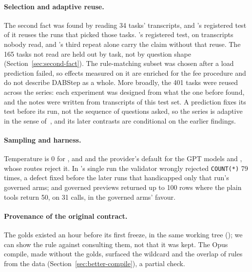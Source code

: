 \paragraph{Selection and adaptive reuse.} The second fact was found by
reading 34 tasks' transcripts, and \mLuna{}'s registered test of it reuses
the runs that picked those tasks. \mQwen{}'s registered test, on
transcripts nobody read, and \mLuna{}'s third repeat alone carry the claim
without that reuse. The 165 tasks not read are held out by task, not by
question shape (Section~\ref{sec:second-fact}). The rule-matching subset was chosen after a
load prediction failed, so effects measured on it are enriched for the fee
procedure and do not describe DABStep as a whole. More broadly, the 401
tasks were reused across the series: each experiment was designed from
what the one before found, and the notes were written from transcripts of
this test set. A prediction fixes its test before its run, not the
sequence of questions asked, so the series is adaptive in the sense
of~\cite{ladder}, and its later contrasts are conditional on the earlier
findings.

\paragraph{Sampling and harness.} Temperature is 0 for \mGLM{}, \mDS{}
and \mQwen{} and the provider's default for the GPT models and \mSON{},
whose routes reject it. In \mGLM{}'s
single run the validator wrongly rejected \texttt{COUNT(*)} 79 times, a
defect fixed before the later runs that handicapped only that run's
governed arms; and governed previews returned up to 100 rows where the
plain tools return 50, on 31 calls, in the governed arms' favour.

\paragraph{Provenance of the original contract.} The golds existed an
hour before its first freeze, in the same working tree
(); we can show the rule against consulting them, not
that it was kept. The Opus compile, made without the golds, surfaced the
wildcard and the overlap of rules from the data
(Section~\ref{sec:better-compile}), a partial check.

\ifextended
